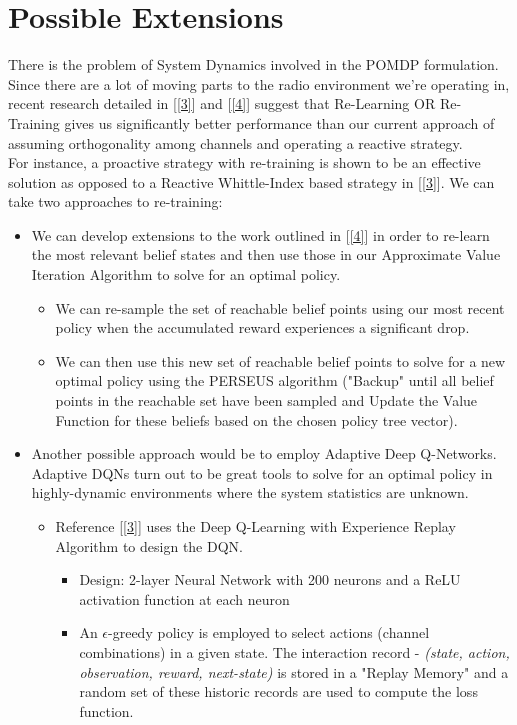 \documentclass{article}
\begin{document}
\section{Possible Extensions}
There is the problem of System Dynamics involved in the POMDP formulation. Since there are a lot of moving parts to the radio environment we're operating in, recent research detailed in [\ref{3}] and [\ref{4}] suggest that Re-Learning OR Re-Training gives us significantly better performance than our current approach of assuming orthogonality among channels and operating a reactive strategy.
\\For instance, a proactive strategy with re-training is shown to be an effective solution as opposed to a Reactive Whittle-Index based strategy in [\ref{3}]. We can take two approaches to re-training:
\begin{itemize}
    \item We can develop extensions to the work outlined in [\ref{4}] in order to re-learn the most relevant belief states and then use those in our Approximate Value Iteration Algorithm to solve for an optimal policy.
    \begin{itemize}
        \item We can re-sample the set of reachable belief points using our most recent policy when the accumulated reward experiences a significant drop.
        \item We can then use this new set of reachable belief points to solve for a new optimal policy using the PERSEUS algorithm ("Backup" until all belief points in the reachable set have been sampled and Update the Value Function for these beliefs based on the chosen policy tree vector).
    \end{itemize}
    \item Another possible approach would be to employ Adaptive Deep Q-Networks. Adaptive DQNs turn out to be great tools to solve for an optimal policy in highly-dynamic environments where the system statistics are unknown.
    \begin{itemize}
        \item Reference [\ref{3}] uses the Deep Q-Learning with Experience Replay Algorithm to design the DQN.
        \begin{itemize}
            \item Design: 2-layer Neural Network with 200 neurons and a ReLU activation function at each neuron
            \item An $\epsilon$-greedy policy is employed to select actions (channel combinations) in a given state. The interaction record - \textit{(state, action, observation, reward, next-state)} is stored in a "Replay Memory" and a random set of these historic records are used to compute the loss function.

\end{itemize}
\end{itemize}
\end{itemize}
\end{document}
